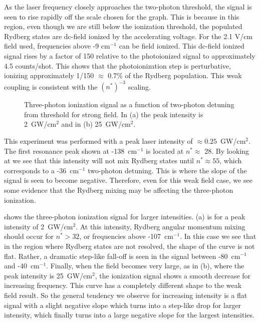 As the laser frequency closely approaches the two-photon threshold, the signal
is seen to rise rapidly off the scale chosen for the graph.  This is because in
this region, even though we are still below the ionization threshold, the
populated Rydberg states are dc-field ionized by the accelerating voltage.  For
the 2.1 V/cm field used, frequencies above -9 cm$^{-1}$ can be field ionized. 
This dc-field ionized signal rises by a factor of 150 relative to the
photoionized signal to approximately 4.5 counts/shot.  This shows that the
photoionization step is perturbative, ionizing approximately 1/150 $\approx$
0.7\% of the Rydberg population.  This weak coupling is consistent with the
$(n^*)^{-3}$ scaling.

\begin{figure}[tbp]
\bigskip
{}
{Three-photon ionization signal as a function of two-photon detuning from
threshold for strong field.  In (a) the peak intensity is 2~GW/cm$^2$ and in
(b) 25~GW/cm$^{2}$.
\label{mix_expt}}
\end{figure}

This experiment was performed with a peak laser intensity of $\approx
0.25$~GW/cm$^2$.  The first resonance peak shown at -138~cm$^{-1}$ is located at
$n^* \approx$ 28.  By looking at  we see that this intensity will
not mix Rydberg states until $n^* \approx 55$, which corresponds to a
-36~cm$^{-1}$ two-photon detuning.  This is where the slope  of the signal is
seen to become negative.  Therefore, even for this weak field case, we see some
evidence that the Rydberg mixing may be affecting the three-photon ionization.

 shows the three-photon ionization signal for larger
intensities.  (a) is for a peak intensity of 2~GW/cm$^2$.  At
this intensity, Rydberg angular momentum mixing should occur for $n^* > 32$, or
frequencies above -107~cm$^{-1}$.  In this case we see that in the region where
Rydberg states are not resolved, the shape of the curve is not flat.  Rather,
a dramatic step-like fall-off is seen in the signal between -80~cm$^{-1}$ and
-40~cm$^{-1}$. Finally, when the field becomes very large, as in
(b), where the peak intensity is 25~GW/cm$^2$, the ionization
signal shows a smooth decrease for increasing frequency.  This curve has a
completely different shape to the weak field result.  So the general tendency
we observe for increasing intensity is a flat signal with a slight negative
slope which turns into a step-like drop for larger intensity, which finally
turns into a large negative slope for the largest intensities.

